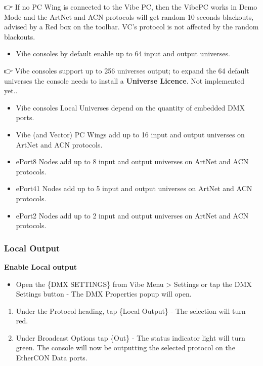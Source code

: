 \documentclass[
]{article}
\providecommand{\tightlist}{%
  \setlength{\itemsep}{0pt}\setlength{\parskip}{0pt}}
\begin{document}
👉 If no PC Wing is connected to the Vibe PC, then the VibePC works in Demo Mode and the ArtNet and ACN protocols will get random 10 seconds blackouts, advised by a Red box on the toolbar. VC's protocol is not affected by the random blackouts.

\begin{itemize}
\tightlist
\item
  Vibe consoles by default enable up to 64 input and output universes.
\end{itemize}

👉 { Vibe consoles support up to 256 universes output; to expand the 64 default universes the console needs to install a \textbf{Universe Licence}. Not implemented yet.}.

\begin{itemize}
\item
  Vibe consoles Local Universes depend on the quantity of embedded DMX ports.
\item
  Vibe (and Vector) PC Wings add up to 16 input and output universes on ArtNet and ACN protocols.
\item
  ePort8 Nodes add up to 8 input and output universes on ArtNet and ACN protocols.
\item
  ePort41 Nodes add up to 5 input and output universes on ArtNet and ACN protocols.
\item
  ePort2 Nodes add up to 2 input and output universes on ArtNet and ACN protocols.
\end{itemize}

\hypertarget{local-output}{%
\subsubsection{Local Output}\label{local-output}}

\textbf{Enable Local output}

\begin{itemize}
\tightlist
\item
  Open the \{DMX SETTINGS\} from Vibe Menu \textgreater{} Settings or tap the DMX Settings button - The DMX Properties popup will open.
\end{itemize}

\begin{enumerate}
\def\labelenumi{\arabic{enumi}.}
\item
  Under the Protocol heading, tap \{Local Output\} - The selection will turn red.
\item
  Under Broadcast Options tap \{Out\} - The status indicator light will turn green. The console will now be outputting the selected protocol on the EtherCON Data ports.
\end{enumerate}
\end{document}
